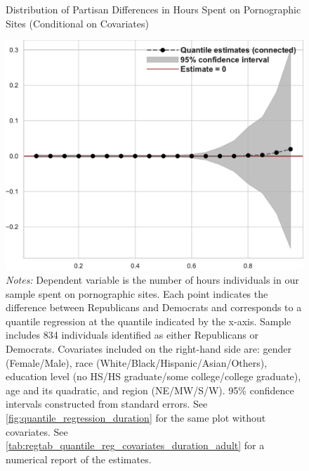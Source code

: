 \documentclass[12pt, letterpaper]{article}
\begin{document}
\begin{figure}[ht]
	\centering
	\caption{Distribution of Partisan Differences in Hours Spent on Pornographic Sites (Conditional on Covariates)}
	\includegraphics[width=.55\linewidth]{../figs/quantile_reg_covariates_duration_adult.pdf}
	\caption*{\footnotesize \emph{Notes:} 
		Dependent variable is the number of hours individuals in our sample spent on pornographic sites.
		Each point indicates the difference between Republicans and Democrats and corresponds to a quantile regression at the quantile indicated by the x-axis.
		Sample includes 834 individuals identified as either Republicans or Democrats.
		Covariates included on the right-hand side are: gender (Female/Male), race (White/Black/Hispanic/Asian/Others), education level (no HS/HS graduate/some college/college graduate), age and its quadratic, and region (NE/MW/S/W).
		95\% confidence intervals constructed from standard errors.
		See \cref{fig:quantile_regression_duration} for the same plot without covariates.
		See \cref{tab:regtab_quantile_reg_covariates_duration_adult} for a numerical report of the estimates.
	}
	\label{fig:quantile_regression_duration_covariates}
\end{figure}
\end{document}
